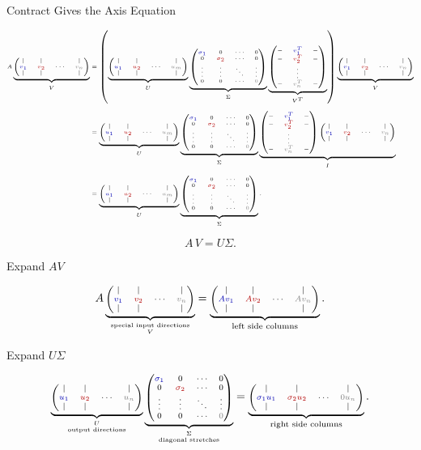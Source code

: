 \documentclass[10pt]{beamer}
\theoremstyle{definition}
\newcommand{\rd}[1]{{\color{red!70!black}#1}}
\newcommand{\bl}[1]{{\color{blue!70!black}#1}}
\newcommand{\gry}[1]{{\color{gray}#1}}
\newcommand{\Vcols}{\begin{pmatrix}|&|& &|\\ \bl{v_1}&\rd{v_2}&\cdots&\gry{v_n}\\ |&|& &|\end{pmatrix}}
\newcommand{\Ucols}{\begin{pmatrix}|&|& &|\\ \bl{u_1}&\rd{u_2}&\cdots&\gry{u_m}\\ |&|& &|\end{pmatrix}}
\newcommand{\Vrows}{\begin{pmatrix}-&\bl{v_1^T}&-\\ -&\rd{v_2^T}&-\\ &\vdots&\\ -&\gry{v_n^T}&-\end{pmatrix}}
\newcommand{\Sigdisplay}{\begin{pmatrix}\bl{\sigma_1}&0&\cdots&0\\ 0&\rd{\sigma_2}&\cdots&0\\ \vdots&\vdots&\ddots&\vdots\\ 0&0&\cdots&\gry{0}\end{pmatrix}}
\begin{document}
\begin{frame}[shrink=18]{Contract Gives the Axis Equation}

\[
\tiny
\begin{aligned}
A
\underbrace{\Vcols}_{V}
&=
\left(
\underbrace{\Ucols}_{U}
\underbrace{\Sigdisplay}_{\Sigma}
\underbrace{\Vrows}_{V^T}
\right)
\underbrace{\Vcols}_{V}\\[0.5em]
&=
\underbrace{\Ucols}_{U}
\underbrace{\Sigdisplay}_{\Sigma}
\underbrace{\Vrows\Vcols}_{I}\\[0.5em]
&=
\underbrace{\Ucols}_{U}
\underbrace{\Sigdisplay}_{\Sigma}.
\end{aligned}
\]

\vfill

\[
\boxed{A\,V=U\Sigma.}
\]

\end{frame}


\begin{frame}[shrink=10]{Expand $AV$}

\[
\scriptsize
A
\underbrace{
\begin{pmatrix}
|&|& &|\\
\bl{v_1}&\rd{v_2}&\cdots&\gry{v_n}\\
|&|& &|
\end{pmatrix}}_{\substack{\text{special input directions}\\ V}}
=
\underbrace{
\begin{pmatrix}
|&|& &|\\
\bl{Av_1}&\rd{Av_2}&\cdots&\gry{Av_n}\\
|&|& &|
\end{pmatrix}}_{\text{left side columns}}.
\]

\end{frame}


\begin{frame}[shrink=10]{Expand $U\Sigma$}

\[
\scriptsize
\underbrace{
\begin{pmatrix}
|&|& &|\\
\bl{u_1}&\rd{u_2}&\cdots&\gry{u_n}\\
|&|& &|
\end{pmatrix}}_{\substack{U\\\text{output directions}}}
\underbrace{
\begin{pmatrix}
\bl{\sigma_1}&0&\cdots&0\\
0&\rd{\sigma_2}&\cdots&0\\
\vdots&\vdots&\ddots&\vdots\\
0&0&\cdots&\gry{0}
\end{pmatrix}}_{\substack{\Sigma\\\text{diagonal stretches}}}
=
\underbrace{
\begin{pmatrix}
|&|& &|\\
\bl{\sigma_1u_1}&\rd{\sigma_2u_2}&\cdots&\gry{0u_n}\\
|&|& &|
\end{pmatrix}}_{\text{right side columns}}.
\]

\end{frame}
\end{document}
